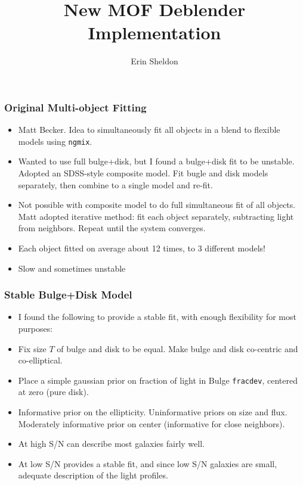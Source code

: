 \documentclass{beamer}
\title{New MOF Deblender Implementation}
\author{Erin Sheldon}
\institute{Brookhaven National Laboratory}
\newcommand{\ngmix}{\texttt{ngmix}}
\begin{document}
\frame{\titlepage}




\frame
{
    \frametitle{Original Multi-object Fitting}

    \begin{itemize}

        \item Matt Becker.
            Idea to simultaneously fit all objects in a blend to 
            flexible models using \ngmix.

        \item Wanted to use full bulge+disk, but I found a bulge+disk fit to be
            unstable. Adopted an SDSS-style composite model.  Fit bugle and
            disk models separately, then combine to a single model and re-fit.

        \item Not possible with composite model to do full simultaneous fit of
            all objects.  Matt adopted iterative method:  fit each object
            separately, subtracting light from neighbors.  Repeat until the
            system converges.
            
        \item Each object fitted on average about 12 times, to 3 different
            models!

        \item Slow and sometimes unstable

    \end{itemize}

}

\frame
{
    \frametitle{Stable Bulge+Disk Model}

    \begin{itemize}

        \item I found the following to provide a stable fit, with
            enough flexibility for most purposes:

        \item Fix size $T$ of bulge and disk to be equal.  Make
            bulge and disk co-centric and co-elliptical.

        \item Place a simple gaussian prior on fraction of light
            in Bulge \texttt{fracdev}, centered at zero (pure disk).

        \item Informative prior on the ellipticity.  Uninformative
            priors on size and flux.  Moderately informative prior
            on center (informative for close neighbors).

        \item At high S/N can describe most galaxies fairly well.
            
        \item At low S/N
            provides a stable fit, and since low S/N galaxies are small, 
            adequate description of the light profiles.

    \end{itemize}

}
\end{document}
